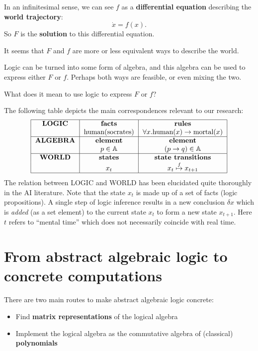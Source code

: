 In an infinitesimal sense, we can see $f$ as a \textbf{differential equation} describing the \textbf{world trajectory}:
\begin{equation}
\dot{x} = f(x) .
\end{equation}
So $F$ is the \textbf{solution} to this differential equation.

It seems that $F$ and $f$ are more or less equivalent ways to describe the world.

Logic can be turned into some form of algebra, and this algebra can be used to express either $F$ or $f$.  Perhaps both ways are feasible, or even mixing the two.

What does it mean to use logic to express $F$ or $f$?

The following table depicts the main correspondences relevant to our research:
\begin{equation}
\begin{tabular}{|c|c|c|}
	\hline
	\textbf{LOGIC} & \textbf{facts} & \textbf{rules} \\
		& \mbox{human(socrates)} & $\forall x. \mbox{human}(x) \rightarrow \mbox{mortal}(x)$ \\
	\hline
	\textbf{ALGEBRA} & \textbf{element} & \textbf{element} \\
		& $p \in \mathbb{A} $ & $(p \rightarrow q) \in \mathbb{A} $ \\
	\hline
	\textbf{WORLD} & \textbf{states} & \textbf{state transitions} \\
		& $x_t$ & $x_t \stackrel{f}{\mapsto} x_{t+1}$ \\
	\hline
\end{tabular}
\end{equation}
The relation between LOGIC and WORLD has been elucidated quite thoroughly in the AI literature.  Note that the state $x_t$ is made up of a set of facts (logic propositions).  A single step of logic inference results in a new conclusion $\delta x$ which is \textit{added} (as a set element) to the current state $x_t$ to form a new state $x_{t+1}$.  Here $t$ refers to ``mental time'' which does not necessarily coincide with real time.

\section{From abstract algebraic logic to concrete computations}

There are two main routes to make abstract algebraic logic concrete:
\begin{itemize}
	\item Find \textbf{matrix representations} of the logical algebra
	\item Implement the logical algebra as the commutative algebra of (classical) \textbf{polynomials}
\end{itemize}


